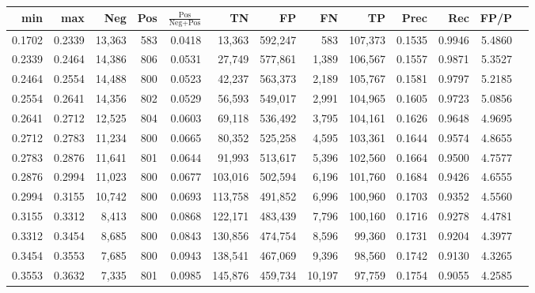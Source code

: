 \begin{tabular}{rrrrrrrrrrrrr}
\toprule
   min &    max &    Neg & Pos & $\frac{\text{Pos}}{\text{Neg}+\text{Pos}}$ &      TN &      FP &      FN &      TP &   Prec &    Rec &   FP/P \\
\midrule
0.1702 & 0.2339 & 13,363 & 583 &                                     0.0418 &  13,363 & 592,247 &     583 & 107,373 & 0.1535 & 0.9946 & 5.4860 \\
0.2339 & 0.2464 & 14,386 & 806 &                                     0.0531 &  27,749 & 577,861 &   1,389 & 106,567 & 0.1557 & 0.9871 & 5.3527 \\
0.2464 & 0.2554 & 14,488 & 800 &                                     0.0523 &  42,237 & 563,373 &   2,189 & 105,767 & 0.1581 & 0.9797 & 5.2185 \\
0.2554 & 0.2641 & 14,356 & 802 &                                     0.0529 &  56,593 & 549,017 &   2,991 & 104,965 & 0.1605 & 0.9723 & 5.0856 \\
0.2641 & 0.2712 & 12,525 & 804 &                                     0.0603 &  69,118 & 536,492 &   3,795 & 104,161 & 0.1626 & 0.9648 & 4.9695 \\
0.2712 & 0.2783 & 11,234 & 800 &                                     0.0665 &  80,352 & 525,258 &   4,595 & 103,361 & 0.1644 & 0.9574 & 4.8655 \\
0.2783 & 0.2876 & 11,641 & 801 &                                     0.0644 &  91,993 & 513,617 &   5,396 & 102,560 & 0.1664 & 0.9500 & 4.7577 \\
0.2876 & 0.2994 & 11,023 & 800 &                                     0.0677 & 103,016 & 502,594 &   6,196 & 101,760 & 0.1684 & 0.9426 & 4.6555 \\
0.2994 & 0.3155 & 10,742 & 800 &                                     0.0693 & 113,758 & 491,852 &   6,996 & 100,960 & 0.1703 & 0.9352 & 4.5560 \\
0.3155 & 0.3312 &  8,413 & 800 &                                     0.0868 & 122,171 & 483,439 &   7,796 & 100,160 & 0.1716 & 0.9278 & 4.4781 \\
0.3312 & 0.3454 &  8,685 & 800 &                                     0.0843 & 130,856 & 474,754 &   8,596 &  99,360 & 0.1731 & 0.9204 & 4.3977 \\
0.3454 & 0.3553 &  7,685 & 800 &                                     0.0943 & 138,541 & 467,069 &   9,396 &  98,560 & 0.1742 & 0.9130 & 4.3265 \\
0.3553 & 0.3632 &  7,335 & 801 &                                     0.0985 & 145,876 & 459,734 &  10,197 &  97,759 & 0.1754 & 0.9055 & 4.2585 \\

\end{tabular}
